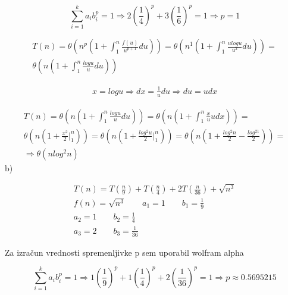 \documentclass[12pt]{article}
\begin{document}
  \begin{equation}
    \sum_{i=1}^{k}{a_ib_i^p} = 1 \Rightarrow 2(\frac{1}{4})^p + 3(\frac{1}{6})^p = 1 \Rightarrow p = 1
  \end{equation}

  \begin{equation}
    \begin{aligned}
      T(n) = \theta(n^p(1 + \int_{1}^{n}{\frac{f(u)}{u^{p+1}}du})) = \theta(n^1(1 + \int_{1}^{n}{\frac{ulogu}{u^2}du})) =\\
      \theta(n(1 + \int_{1}^{n}{\frac{logu}{u}du}))
    \end{aligned}
  \end{equation}

  \begin{align}
    x = logu \Rightarrow dx = \frac{1}{u}du \Rightarrow du = udx
  \end{align}

  \begin{equation}
    \begin{aligned}
      T(n) = \theta(n(1 + \int_{1}^{n}{\frac{logu}{u}du})) = \theta(n(1 + \int_{1}^{n}{\frac{x}{u}udx})) =\\
      \theta(n(1 + \frac{x^2}{2}\rvert_{1}^{n})) = \theta(n(1 + \frac{log^2u}{2}\rvert_{1}^{n})) = \theta(n(1 + \frac{log^2n}{2} - \frac{log^21}{2})) = \\
      \Rightarrow \theta(nlog^2n)
    \end{aligned}
  \end{equation}
  b)

  \begin{equation}
    \begin{aligned}
      T(n) = T(\frac{n}{9}) + T(\frac{n}{4}) + 2T(\frac{n}{36}) + \sqrt{n^3}\\
      f(n)=\sqrt{n^3}\qquad a_1 = 1\qquad b_1 = \frac{1}{9}\\
      a_2 = 1\qquad b_2 = \frac{1}{4}\\
      a_3 = 2\qquad b_3 = \frac{1}{36}
    \end{aligned}
  \end{equation}

  Za izračun vrednosti spremenljivke p sem uporabil wolfram alpha

  \begin{equation}
    \sum_{i=1}^{k}{a_ib_i^p} = 1 \Rightarrow 1(\frac{1}{9})^p + 1(\frac{1}{4})^p + 2(\frac{1}{36})^p = 1 \Rightarrow p \approx 0.5695215
  \end{equation}
\end{document}
